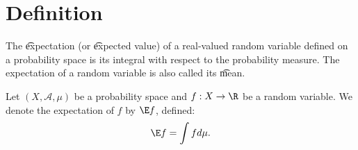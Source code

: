 
\section*{Definition}

The \t{expectation} (or \t{expected value}) of a real-valued random variable defined on a probability space is its integral with respect to the probability measure.
The expectation of a random variable is also called its \t{mean}.


Let $(X, \mathcal{A} , \mu )$ be a probability space and $f: X \to \R $ be a random variable.
We denote the expectation of $f$ by $\E f$, defined:
  \[
\E  f = \int f d\mu .
  \]

\blankpage